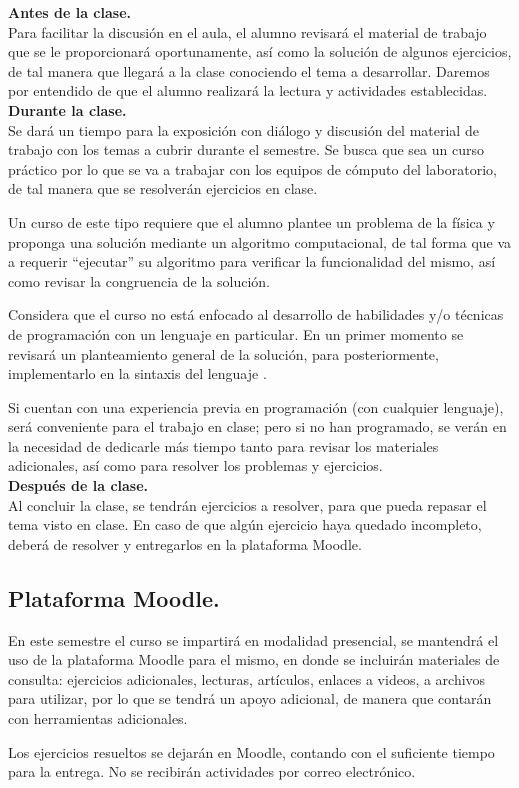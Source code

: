 \noindent
\textbf{Antes de la clase.}
\\
Para facilitar la discusión en el aula, el alumno revisará el material de trabajo que se le proporcionará oportunamente, así como la solución de algunos ejercicios, de tal manera que llegará a la clase conociendo el tema a desarrollar. Daremos por entendido de que el alumno realizará la lectura y actividades establecidas.
\\
\textbf{Durante la clase.}
\\
Se dará un tiempo para la exposición con diálogo y discusión del material de trabajo con los temas a cubrir durante el semestre. Se busca que sea un curso práctico por lo que se va a trabajar con los equipos de cómputo del laboratorio, de tal manera que se resolverán ejercicios en clase.
\par
Un curso de este tipo requiere que el alumno plantee un problema de la física y proponga una solución mediante un algoritmo computacional, de tal forma que va a requerir \enquote{ejecutar} su algoritmo para verificar la funcionalidad del mismo, así como revisar la congruencia de la solución.
\par
Considera que el curso no está enfocado al desarrollo de habilidades y/o técnicas de programación con un lenguaje en particular. En un primer momento se revisará un planteamiento general de la solución, para posteriormente, implementarlo en la sintaxis del lenguaje \python.
\par
Si cuentan con una experiencia previa en programación (con cualquier lenguaje), será conveniente para el trabajo en clase; pero si no han programado, se verán en la necesidad de dedicarle más tiempo tanto para revisar los materiales adicionales, así como para resolver los problemas y ejercicios.
\\
\textbf{Después de la clase.}
\\
Al concluir la clase, se tendrán ejercicios a resolver, para que pueda repasar el tema visto en clase. En caso de que algún ejercicio haya quedado incompleto, deberá de resolver y entregarlos en la plataforma Moodle.

\subsection{Plataforma Moodle.}

En este semestre el curso se impartirá en modalidad presencial, se mantendrá el uso de la plataforma Moodle para el mismo, en donde se incluirán materiales de consulta: ejercicios adicionales, lecturas, artículos, enlaces a videos, a archivos para utilizar, por lo que se tendrá un apoyo adicional, de manera que contarán con herramientas adicionales.
\par
Los ejercicios resueltos se dejarán en Moodle, contando con el suficiente tiempo para la entrega. No se recibirán actividades por correo electrónico.

